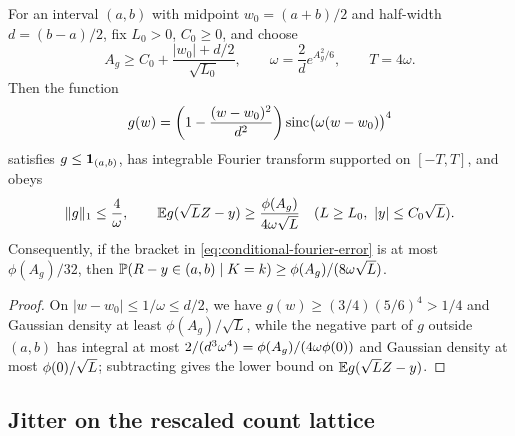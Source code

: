 \begin{lemma}\label{lem:minorant}
For an interval $(a,b)$ with midpoint $w_0=(a+b)/2$ and half-width
$d=(b-a)/2$, fix $L_0>0$, $C_0\ge0$, and choose
\[
 A_g\ge C_0+\frac{|w_0|+d/2}{\sqrt{L_0}},\qquad
 \omega=\frac2d e^{A_g^2/6},\qquad T=4\omega.
\]
Then the function
\[
 g(w)=\left(1-\frac{(w-w_0)^2}{d^2}\right)
                      \operatorname{sinc}\bigl(\omega(w-w_0)\bigr)^4
\]
satisfies $g\le\mathbf 1_{(a,b)}$, has integrable Fourier transform supported on
$[-T,T]$, and obeys
\[
 \|g\|_1\le\frac4\omega,\qquad
 \mathbb E g(\sqrt L Z-y)\ge\frac{\phi(A_g)}{4\omega\sqrt L}
            \quad(L\ge L_0,\ |y|\le C_0\sqrt L).
\]
Consequently, if the bracket in \eqref{eq:conditional-fourier-error} is at
most $\phi(A_g)/32$, then $\mathbb P(R-y\in(a,b)\mid K=k)\ge\phi(A_g)/(8\omega\sqrt L)$.
\end{lemma}
\begin{proof}
On $|w-w_0|\le1/\omega\le d/2$, we have $g(w)\ge(3/4)(5/6)^4>1/4$ and
Gaussian density at least $\phi(A_g)/\sqrt L$, while the negative part of $g$
outside $(a,b)$ has integral at most $2/(d^3\omega^4)=\phi(A_g)/(4\omega\phi(0))$
and Gaussian density at most $\phi(0)/\sqrt L$; subtracting gives the lower bound
on $\mathbb E g(\sqrt L Z-y)$.
\end{proof}

\subsection{Jitter on the rescaled count lattice}

